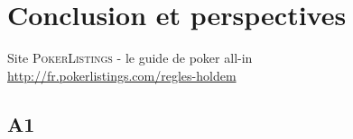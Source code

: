 \documentclass[11pt,twoside]{scrreprt}
\begin{document}
	
	
	
	
\chapter*{Conclusion et perspectives} %
	
	


\begin{thebibliography}{9}

%

		Site \textsc{PokerListings - }\textsf{le guide de poker all-in} \\
		\url{http://fr.pokerlistings.com/regles-holdem}

\end{thebibliography}

\begin{appendices}

	\chapter{A1}
	\label{a1}
	
\end{appendices}
\newpage
\newpage
\end{document}
